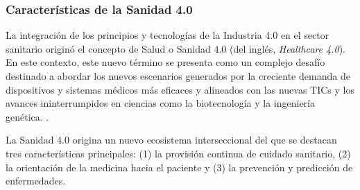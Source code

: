 \subsubsection{Características de la Sanidad 4.0}

La integración de los principios y tecnologías de la Industria 4.0 en el sector sanitario originó el concepto de Salud o Sanidad 4.0 (del inglés, \textit{Healthcare 4.0})\cite{tortorella2020healthcare}\cite{tortorella2021impacts}.  %
En este contexto, este nuevo término se presenta como un complejo desafío  destinado a abordar los nuevos escenarios generados por la creciente demanda de dispositivos y sistemas médicos más eficaces y alineados con las nuevas TICs y los avances ininterrumpidos en ciencias como la biotecnología y la ingeniería genética. \cite{martin2021ehealth}. 

La Sanidad 4.0 origina un nuevo ecosistema interseccional del que se destacan tres  características principales: (1) la provisión continua de cuidado sanitario, (2) la orientación de la medicina hacia el paciente y (3) la prevención y predicción de enfermedades.



